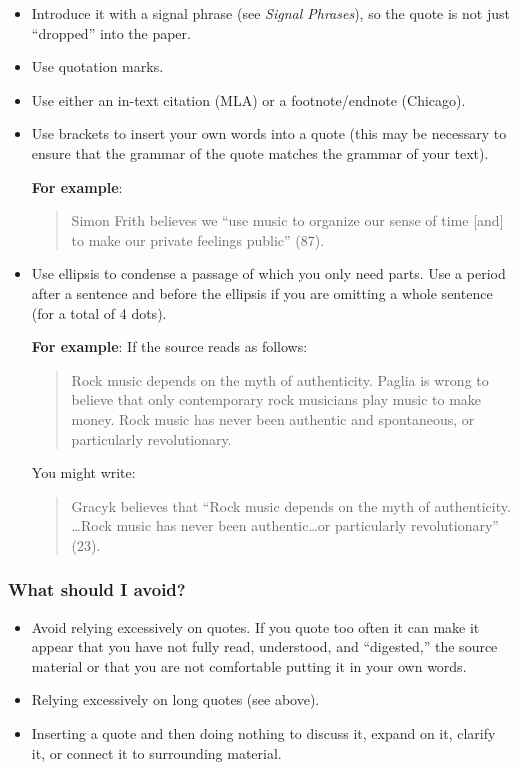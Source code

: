\documentclass[12pt, hidelinks]{article} %
\begin{document}
 \begin{itemize}       	
\item Introduce it with a signal phrase (see \emph{Signal Phrases}), so the quote is not just ``dropped'' into the paper.

\item Use quotation marks.

\item Use either an in-text citation (MLA) or a footnote/endnote (Chicago).
        	
\item Use brackets to insert your own words into a quote (this may be necessary to ensure that the grammar of the quote matches the grammar of your text).

\textbf{For example}:

\begin{quote} Simon Frith believes we ``use music to organize our sense of time [and] to make our private feelings public'' (87). 
\end{quote}

\item Use ellipsis to condense a passage of which you only need parts. Use a period after a sentence and before the ellipsis if you are omitting a whole sentence (for a total of 4
dots).

\textbf{For example}:
 If the source reads as follows:
\begin{quote}
Rock music depends on the myth of authenticity. Paglia is wrong to believe that only contemporary rock musicians play music to make money. Rock music has never been authentic and spontaneous, or particularly revolutionary.
\end{quote}
         
You might write:
\begin{quote}
Gracyk believes that ``Rock music depends on the myth of authenticity. \ldots Rock music has never been authentic\ldots  or particularly revolutionary'' (23).
 \end{quote}
 \end{itemize}
 
\subsubsection{What should I avoid?}

\begin{itemize}
\item Avoid relying excessively on quotes. If you quote too often it can make it appear that you have not fully read, understood, and ``digested,'' the source material or that you are not comfortable putting it in your own words.

\item Relying excessively on long quotes (see above).

\item Inserting a quote and then doing nothing to discuss it, expand on it, clarify it, or connect it to surrounding material.

\end{itemize}
\end{document}
